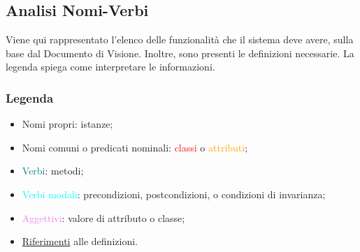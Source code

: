 
\subsection{Analisi Nomi-Verbi}
Viene qui rappresentato l’elenco delle funzionalità che il sistema deve avere, sulla base dal Documento di Visione.
Inoltre, sono presenti le definizioni necessarie.
La legenda spiega come interpretare le informazioni.

\subsubsection{Legenda}

\begin{itemize}
    \item Nomi propri: istanze;
    \item Nomi comuni o predicati nominali: \textcolor{red}{classi} o \textcolor{orange}{attributi};
    \item \textcolor{teal}{Verbi}: metodi;
    \item \textcolor{cyan}{Verbi modali}: precondizioni, postcondizioni, o condizioni di invarianza;
    \item \textcolor{violet}{Aggettivi}: valore di attributo o classe;
    \item  \underline{Riferimenti} alle definizioni.
\end{itemize}

